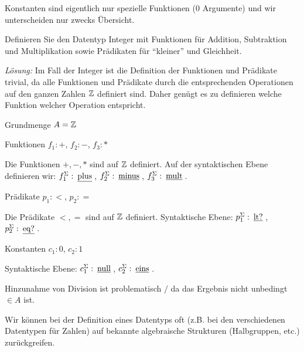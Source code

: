 Konstanten sind eigentlich nur spezielle Funktionen ($0$ Argumente) und wir unterscheiden nur zwecks Übersicht.
\begin{bsp}
Definieren Sie den Datentyp Integer mit Funktionen für Addition, Subtraktion und Multiplikation sowie Prädikaten für
``kleiner'' und Gleichheit.

\textit{Lösung:}
Im Fall der Integer ist die Definition der Funktionen und Prädikate trivial, da
alle Funktionen und Prädikate durch die entsprechenden Operationen auf den ganzen Zahlen $\mathbb{Z}$ definiert sind.
Daher genügt es zu definieren welche Funktion welcher Operation entspricht.
\begin{\whichitem}\label{defn:integer}
\item Grundmenge $A=\mathbb{Z}$
\item Funktionen $f_1: +$, $f_2: -$, $f_3: *$

Die Funktionen $+, -, *$ sind auf $\mathbb{Z}$ definiert.
Auf der syntaktischen Ebene definieren wir: $f^{\Sigma}_1: {\operatorname*{\:\underline{plus}\:}}$, $f^{\Sigma}_2: {\operatorname*{\:\underline{minus}\:}}$, $f^{\Sigma}_3: {\operatorname*{\:\underline{mult}\:}}$.
\item Prädikate $p_1: <$, $p_2: =$

Die Prädikate $<, =$ sind auf $\mathbb{Z}$ definiert.
Syntaktische Ebene: $p^{\Sigma}_1: {\operatorname*{\:\underline{lt?}\:}}$, $p^{\Sigma}_2: {\operatorname*{\:\underline{eq?}\:}}$.
\item Konstanten $c_1: 0$, $c_2: 1$

Syntaktische Ebene: $c^{\Sigma}_1: {\operatorname*{\:\underline{null}\:}}$, $c^{\Sigma}_2: {\operatorname*{\:\underline{eins}\:}}$.
\end{\whichitem}
Hinzunahme von Division ist problematisch $/$ da das Ergebnis nicht unbedingt $\in A$ ist.
\end{bsp}
Wir können bei der Definition eines Datentyps oft (z.B. bei den verschiedenen Datentypen für Zahlen) auf bekannte algebraische Strukturen (Halbgruppen, etc.) zurückgreifen.

